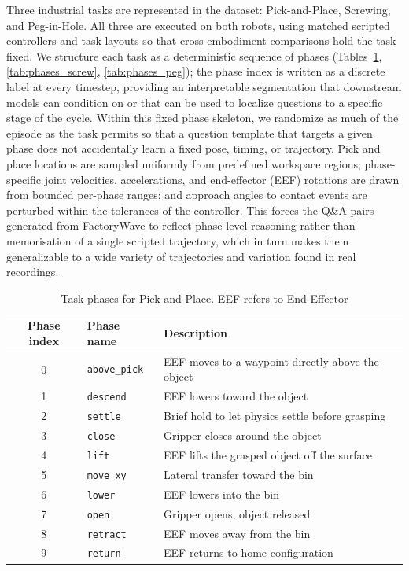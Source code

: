 Three industrial tasks are represented in the dataset: Pick-and-Place, Screwing, and Peg-in-Hole. All three are executed on both robots, using matched scripted controllers and task layouts so that cross-embodiment comparisons hold the task fixed. We structure each task as a deterministic sequence of phases (Tables~\ref{tab:phases_pp}, \ref{tab:phases_screw}, \ref{tab:phases_peg}); the phase index is written as a discrete label at every timestep, providing an interpretable segmentation that downstream models can condition on or that can be used to localize questions to a specific stage of the cycle. Within this fixed phase skeleton, we randomize as much of the episode as the task permits so that a question template that targets a given phase does not accidentally learn a fixed pose, timing, or trajectory. Pick and place locations are sampled uniformly from predefined workspace regions; phase-specific joint velocities, accelerations, and end-effector (EEF) rotations are drawn from bounded per-phase ranges; and approach angles to contact events are perturbed within the tolerances of the controller. This forces the Q\&A pairs generated from FactoryWave to reflect phase-level reasoning rather than memorisation of a single scripted trajectory, which in turn makes them generalizable to a wide variety of trajectories and variation found in real recordings.

\begin{table}[htbp]
    \centering
    \caption{Task phases for Pick-and-Place. EEF refers to End-Effector}
    \label{tab:phases_pp}
    \small
    \begin{tabular}{clp{8cm}}
        \toprule
        Phase index & Phase name           & Description                                       \\
        \midrule
        0           & \texttt{above\_pick} & EEF moves to a waypoint directly above the object \\
        1           & \texttt{descend}     & EEF lowers toward the object                      \\
        2           & \texttt{settle}      & Brief hold to let physics settle before grasping  \\
        3           & \texttt{close}       & Gripper closes around the object                  \\
        4           & \texttt{lift}        & EEF lifts the grasped object off the surface      \\
        5           & \texttt{move\_xy}    & Lateral transfer toward the bin                   \\
        6           & \texttt{lower}       & EEF lowers into the bin                           \\
        7           & \texttt{open}        & Gripper opens, object released                    \\
        8           & \texttt{retract}     & EEF moves away from the bin                       \\
        9           & \texttt{return}      & EEF returns to home configuration                 \\
        \bottomrule
    \end{tabular}
\end{table}


